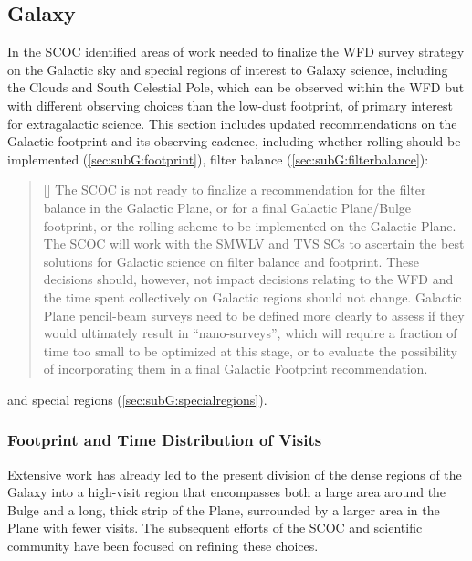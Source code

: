 \subsection{Galaxy}\label{sec:galaxy}
In  the SCOC identified areas of work needed to finalize the WFD survey strategy on the Galactic sky and special regions of interest to Galaxy science, including the Clouds and South Celestial Pole, which can be observed within the WFD but with different observing choices than the low-dust footprint, of primary interest for extragalactic science. This section includes updated recommendations on the Galactic footprint and its observing cadence, including whether rolling should be implemented (\autoref{sec:subG:footprint}), filter balance (\autoref{sec:subG:filterbalance}):
\begin{quote}
    [] The SCOC is not ready to finalize a recommendation for the
filter balance in the Galactic Plane, or for a final Galactic Plane/Bulge footprint, or the rolling scheme to be implemented on the Galactic Plane. The SCOC will work with the SMWLV and TVS SCs to ascertain the best solutions for Galactic science on filter balance and footprint. These decisions should, however, not impact decisions relating to the WFD and the time spent collectively on Galactic regions should not change.
Galactic Plane pencil-beam surveys need to be defined more clearly to assess if they would ultimately result in ``nano-surveys'', which will require a fraction of time too small to be optimized at this stage, or to evaluate the possibility of incorporating them in a final Galactic Footprint recommendation.



\end{quote}and special regions (\autoref{sec:subG:specialregions}).

\subsubsection{Footprint and Time Distribution of Visits}\label{sec:subG:footprint}

Extensive work has already led to the present division of the dense regions of the Galaxy into a high-visit region that encompasses both a large area around the Bulge and a long, thick strip of the Plane, surrounded by a larger area in the Plane with fewer visits. %
The subsequent efforts of the SCOC and scientific community have been focused on refining these choices.

